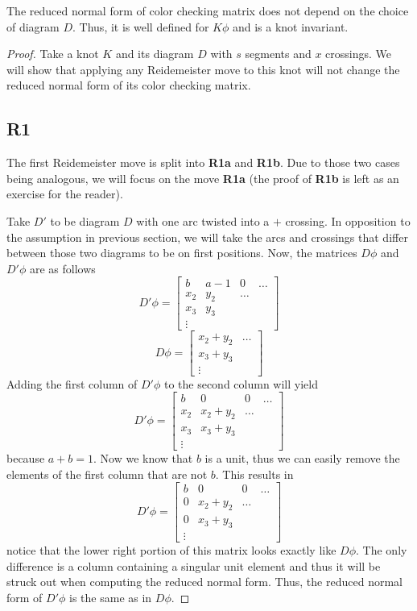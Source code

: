 \begin{theorem}
  The reduced normal form of color checking matrix does not depend on the choice of diagram $D$. Thus, it is well defined for $K\phi$ and is a knot invariant.
\end{theorem}

\begin{proof}
Take a knot $K$ and its diagram $D$ with $s$ segments and $x$ crossings. We will show that applying any Reidemeister move to this knot will not change the reduced normal form of its color checking matrix.

  \subsection*{\centering R1}

  The first Reidemeister move is split into \textbf{R1a} and \textbf{R1b}. Due to those two cases being analogous, we will focus on the move \textbf{R1a} (the proof of \textbf{R1b} is left as an exercise for the reader).

  Take $D'$ to be diagram $D$ with one arc twisted into a $+$ crossing. In opposition to the assumption in previous section, we will take the arcs and crossings that differ between those two diagrams to be on first positions. Now, the matrices $D\phi$ and $D'\phi$ are as follows
  $$
  D'\phi=
  \begin{bmatrix}
    b & a-1 & 0 & \hdots\\ 
    x_2 & y_2 & \hdots \\ 
    x_3 & y_3 \\ 
    \vdots 
  \end{bmatrix}
  $$
  $$
  D\phi=
  \begin{bmatrix}
    x_2 + y_2 & \hdots \\ 
    x_3 + y_3 \\ 
    \vdots
  \end{bmatrix}
  $$
  Adding the first column of $D'\phi$ to the second column will yield 
  $$
  D'\phi=
  \begin{bmatrix}
    b & 0 & 0 & \hdots\\ 
    x_2 & x_2+y_2 & \hdots \\ 
    x_3 & x_3+y_3 \\ 
    \vdots 
  \end{bmatrix}
  $$
  because $a+b=1$. Now we know that $b$ is a unit, thus we can easily remove the elements of the first column that are not $b$. This results in 
  $$
  D'\phi=
  \begin{bmatrix}
    b & 0 & 0 & \hdots\\ 
    0 & x_2+y_2 & \hdots \\ 
    0 & x_3+y_3 \\ 
    \vdots 
  \end{bmatrix}
  $$
  notice that the lower right portion of this matrix looks exactly like $D\phi$. The only difference is a column containing a singular unit element and thus it will be struck out when computing the reduced normal form. Thus, the reduced normal form of $D'\phi$ is the same as in $D\phi$.
  

\end{proof}
